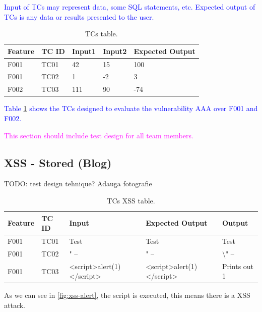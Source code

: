 \documentclass{article}
\begin{document}
\textcolor{blue}{Input of TCs may represent data, some SQL statements, etc. Expected output of TCs is any data or results presented to the user.}

\begin{table} [htpb]
    \centering
    \begin{tabular}{l|l|l|l|l}
        Feature & TC ID & Input1 & Input2 & Expected Output \\ \hline
        F001    & TC01  & 42     & 15     & 100             \\
        F001    & TC02  & 1      & -2     & 3               \\
        F002    & TC03  & 111    & 90     & -74             \\
    \end{tabular}
    \caption{\label{tab:TCs1}TCs table.}
\end{table}

\textcolor{blue}{Table \ref{tab:TCs1} shows the TCs designed to evaluate the vulnerability AAA over F001 and F002.}


\textcolor{magenta}{This section should include test design for all team members.}


\subsection{XSS - Stored (Blog)}
TODO: test design tehnique? Adauga fotografie
\begin{table} [htpb]
    \centering
    \begin{tabular}{l|l|l|l|l}
        Feature & TC ID & Input                     & Expected Output           & Output              \\ \hline
        F001    & TC01  & Test                      & Test                      & Test                \\
        F001    & TC02  & " --                      & " --                      & \textbackslash " -- \\
        F001    & TC03  & <script>alert(1)</script> & <script>alert(1)</script> & Prints out 1        \\
    \end{tabular}
    \caption{\label{tab:TC-XSS}TCs XSS table.}
\end{table}

As we can see in \ref{fig:xss-alert}, the script is executed, this means there is a XSS attack.
\end{document}
